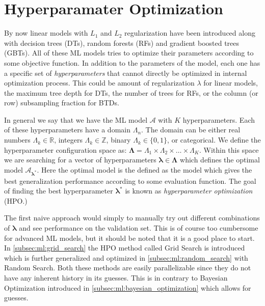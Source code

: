 \section{Hyperparamater Optimization}
\label{sec:ml:hyperparameter_optimization}
By now linear models with $L_1$ and $L_2$ regularization have been introduced along with decision trees (DTs), random forests (RFs) and gradient boosted trees (GBTs). All of these ML models tries to optimize their parameters according to some objective function. In addition to the parameters of the model, each one has a specific set of \emph{hyperparameters} that cannot directly be optimized in internal optimization process. This could be amount of regularization $\lambda$ for linear models, the maximum tree depth for DTs, the number of trees for RFs, or the column (or row) subsampling fraction for BTDs. 

In general we say that we have the ML model $\mathcal{A}$ with $K$ hyperparameters. Each of these hyperparameters have a domain $\Lambda_n$. The domain can be either real numbers $\Lambda_k \in \mathbb{R}$, integers $\Lambda_k \in \mathbb{Z}$, binary $\Lambda_k \in \{0, 1\}$, or categorical. We define the hyperparameter configuration space as: $\bm{\Lambda} = \Lambda_1 \times \Lambda_2 \times \dots \times \Lambda_K$. Within this space we are searching for a vector of hyperparameters $\bm{\lambda} \in \bm{\Lambda}$ which defines the optimal model $\mathcal{A}_{\bm{\lambda}^*}$. Here the optimal model is the defined as the model which gives the best generalization performance according to some evaluation function. The goal of finding the best hyperparameter $\bm{\lambda^*}$ is known as \emph{hyperparameter optimization} (HPO.)

The first naive approach would simply to manually try out different combinations of $\bm{\lambda}$ and see performance on the validation set. This is of course too cumbersome for advanced ML models, but it should be noted that it is a good place to start. In \autoref{subsec:ml:grid_search} the HPO method called Grid Search is introduced which is further generalized and optimized in \autoref{subsec:ml:random_search} with Random Search. Both these methods are easily parallelizable since they do not have any inherent history in its guesses. This is in contrary to Bayesian Optimization introduced in \autoref{subsec:ml:bayesian_optimization} which allows for  guesses.

